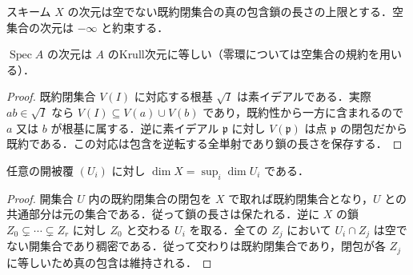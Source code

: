 \begin{defn}[スキームの次元]
スキーム $X$ の次元は空でない既約閉集合の真の包含鎖の長さの上限とする．空集合の次元は $-\infty$ と約束する．
\end{defn}
\begin{prop}[アフィンスキームの次元]
$\operatorname{Spec}A$ の次元は $A$ のKrull次元に等しい（零環については空集合の規約を用いる）．
\end{prop}
\begin{proof}
既約閉集合 $V(I)$ に対応する根基 $\sqrt I$ は素イデアルである．実際 $ab\in\sqrt I$ なら $V(I)\subseteq V(a)\cup V(b)$ であり，既約性から一方に含まれるので $a$ 又は $b$ が根基に属する．逆に素イデアル $\mathfrak p$ に対し $V(\mathfrak p)$ は点 $\mathfrak p$ の閉包だから既約である．この対応は包含を逆転する全単射であり鎖の長さを保存する．
\end{proof}
\begin{prop}[開被覆と次元]
任意の開被覆 $(U_i)$ に対し $\dim X=\sup_i\dim U_i$ である．
\end{prop}
\begin{proof}
開集合 $U$ 内の既約閉集合の閉包を $X$ で取れば既約閉集合となり，$U$ との共通部分は元の集合である．従って鎖の長さは保たれる．逆に $X$ の鎖 $Z_0\subsetneq\cdots\subsetneq Z_r$ に対し $Z_0$ と交わる $U_i$ を取る．全ての $Z_j$ において $U_i\cap Z_j$ は空でない開集合であり稠密である．従って交わりは既約閉集合であり，閉包が各 $Z_j$ に等しいため真の包含は維持される．
\end{proof}
